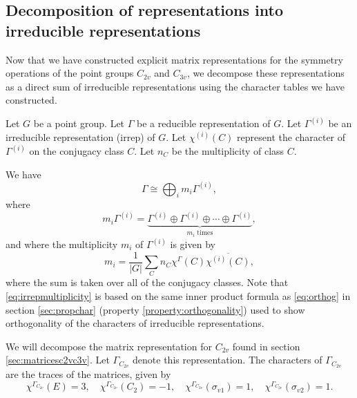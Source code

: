 \documentclass{article}
\begin{document}
    \subsection{Decomposition of representations into irreducible representations}

    Now that we have constructed explicit matrix representations for the symmetry operations of the point groups $C_{2v}$ and $C_{3v}$, we decompose these representations as a direct sum of irreducible representations using the character tables we have constructed.

    Let $G$ be a point group. Let $\Gamma$ be a reducible representation of $G$. Let $\Gamma^{(i)}$ be an irreducible representation (irrep) of $G$. Let $\chi^{(i)}(C)$ represent the character of $\Gamma^{(i)}$ on the conjugacy class $C$. Let $n_C$ be the multiplicity of class $C$.

    We have \begin{equation}\Gamma \cong \bigoplus_i m_i \Gamma^{(i)},\label{eq:directsum}\end{equation}
    where \[m_i\Gamma^{(i)}=\underbrace{\Gamma^{(i)}\oplus\Gamma^{(i)}\oplus\cdots\oplus\Gamma^{(i)}}_{m_i \text{ times}},\] and where the multiplicity $m_i$ of $\Gamma^{(i)}$ is given by \begin{equation}m_i = \frac1{|G|} \sum_{C} n_C\chi^\Gamma(C)\overline{\chi^{(i)}(C)},\label{eq:irrepmultiplicity}\end{equation} where the sum is taken over all of the conjugacy classes. Note that \eqref{eq:irrepmultiplicity} is based on the same inner product formula as \eqref{eq:orthog} in section \ref{sec:propchar} (property \ref{property:orthogonality}) used to show orthogonality of the characters of irreducible representations.

    We will decompose the matrix representation for $C_{2v}$ found in section \ref{sec:matricesc2vc3v}. Let $\Gamma_{C_{2v}}$ denote this representation. The characters of $\Gamma_{C_{2v}}$ are the traces of the matrices, given by
    \[
        \chi^{\Gamma_{C_{2v}}}(E)=3,\quad
        \chi^{\Gamma_{C_{2v}}}(C_2)=-1,\quad
        \chi^{\Gamma_{C_{2v}}}(\sigma_{v1})=1,\quad
        \chi^{\Gamma_{C_{2v}}}(\sigma_{v2})=1.
    \]
\end{document}
